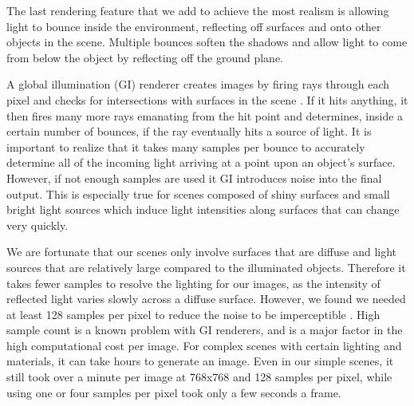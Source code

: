 The last rendering feature that we add to achieve the most realism is allowing light to bounce inside the environment, reflecting off surfaces and onto other objects in the scene.  Multiple bounces soften the shadows and allow light to come from below the object by reflecting off the ground plane. 

A global illumination (GI) renderer creates images by firing rays through each pixel and checks for intersections with surfaces in the scene .  If it hits anything, it then fires many more rays emanating from the hit point and determines, inside a certain number of bounces, if the ray eventually hits a source of light.  It is important to realize that it takes many samples per bounce to accurately determine all of the incoming light arriving at a point upon an object's surface.
However, if not enough samples are used it GI introduces noise into the final output. This is especially true for scenes composed of shiny surfaces and small bright light sources which induce light intensities along surfaces that can change very quickly. 

We are fortunate that our scenes only  involve surfaces that are diffuse and light sources that are relatively large compared to the illuminated objects.  Therefore it takes fewer samples to resolve the lighting for our images, as the intensity of reflected light varies slowly across a diffuse surface.  However, we found we needed at least 128 samples per pixel to reduce the noise to be imperceptible . High sample count is a known problem with GI renderers, and is a major factor in the high computational cost per image.  For complex scenes with certain lighting and materials, it can take hours to generate an image.  Even in our simple  scenes, it still took over a minute per image at 768x768 and 128 samples per pixel, while using one or four samples per pixel took only a few seconds a frame.

